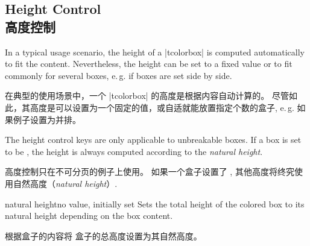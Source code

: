 \subsection{Height Control\\高度控制}\label{sec:heightcontrol}

In a typical usage scenario, the height of a |tcolorbox| is computed automatically
to fit the content. Nevertheless, the height can be set to a fixed value
or to fit commonly for several boxes, e.\,g. if boxes are set side by side.
 
在典型的使用场景中，一个 |tcolorbox| 的高度是根据内容自动计算的。 
尽管如此，其高度是可以设置为一个固定的值，或自适就能放置指定个数的盒子, e.\,g. 如果例子设置为并排。

\bigskip
\begin{marker}
The height control keys are only applicable to unbreakable boxes.
If a box is set to be , the height is always
computed according to the \emph{natural height}.

高度控制只在不可分页的例子上使用。
如果一个盒子设置了 , 其他高度将终究使用自然高度（\emph{natural height}）.
\end{marker}
\bigskip


\begin{docTcbKey}{natural height}{}{no value, initially set}
Sets the total height of the colored box to its natural height depending
on the box content.

根据盒子的内容将%
盒子的总高度设置为其自然高度。
\end{docTcbKey}

